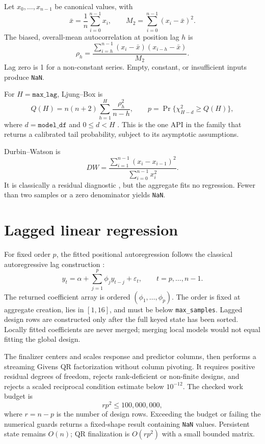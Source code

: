 \documentclass[11pt]{article}
\begin{document}
Let $x_0,\ldots,x_{n-1}$ be canonical values, with
\[
\bar x=\frac1n\sum_{i=0}^{n-1}x_i,
\qquad M_2=\sum_{i=0}^{n-1}(x_i-\bar x)^2.
\]
The biased, overall-mean autocorrelation at position lag $h$ is
\[
\rho_h=
\frac{\sum_{i=h}^{n-1}(x_i-\bar x)(x_{i-h}-\bar x)}{M_2}.
\]
Lag zero is 1 for a non-constant series. Empty, constant, or insufficient inputs produce \texttt{NaN}.

For $H=\texttt{max\_lag}$, Ljung--Box is
\[
Q(H)=n(n+2)\sum_{h=1}^{H}\frac{\rho_h^2}{n-h},
\qquad
p=\Pr\{\chi^2_{H-d}\ge Q(H)\},
\]
where $d=\texttt{model\_df}$ and $0\le d<H$ \cite{boxpierce1970,ljungbox1978}. This is the one API in the family that returns a calibrated tail probability, subject to its asymptotic assumptions.

Durbin--Watson is
\[
DW=\frac{\sum_{i=1}^{n-1}(x_i-x_{i-1})^2}
         {\sum_{i=0}^{n-1}x_i^2}.
\]
It is classically a residual diagnostic \cite{durbinwatson1950,durbinwatson1971}, but the aggregate fits no regression. Fewer than two samples or a zero denominator yields \texttt{NaN}.

\section{Lagged linear regression}

For fixed order $p$, the fitted positional autoregression follows the classical autoregressive lag construction \cite{yule1927}:
\[
y_t=\alpha+\sum_{j=1}^{p}\phi_j y_{t-j}+\varepsilon_t,
\qquad t=p,\ldots,n-1.
\]
The returned coefficient array is ordered $(\phi_1,\ldots,\phi_p)$. The order is fixed at aggregate creation, lies in $[1,16]$, and must be below \texttt{max\_samples}. Lagged design rows are constructed only after the full keyed state has been sorted. Locally fitted coefficients are never merged; merging local models would not equal fitting the global design.

The finalizer centers and scales response and predictor columns, then performs a streaming Givens QR factorization without column pivoting. It requires positive residual degrees of freedom, rejects rank-deficient or non-finite designs, and rejects a scaled reciprocal condition estimate below $10^{-12}$. The checked work budget is
\[
r p^2\le 100{,}000{,}000,
\]
where $r=n-p$ is the number of design rows. Exceeding the budget or failing the numerical guards returns a fixed-shape result containing \texttt{NaN} values. Persistent state remains $O(n)$; QR finalization is $O(rp^2)$ with a small bounded matrix.
\end{document}
